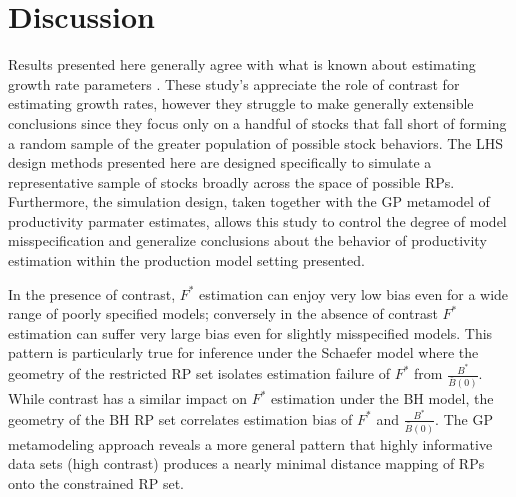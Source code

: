 %
\section{Discussion}


%
Results presented here generally agree with what is known about estimating
growth rate parameters .
These study's appreciate the role of contrast for estimating growth rates, 
however they struggle to make generally extensible conclusions since they focus only 
on a handful of stocks that fall short of forming a random sample of the greater 
population of possible stock behaviors. The LHS design methods presented here are 
designed specifically to simulate a representative sample of stocks broadly 
across the space of possible RPs. Furthermore, the simulation design, taken together 
with the GP metamodel of productivity parmater estimates, allows this study to control 
the degree of model misspecification and generalize conclusions about the behavior 
of productivity estimation within the production model setting presented. 


%
In the presence of contrast, $F^*$ estimation can enjoy very low bias even
for a wide range of poorly specified models; conversely in the absence of contrast
$F^*$ estimation can suffer very large bias even for slightly misspecified models.
This pattern is particularly true for inference under the Schaefer model where the 
geometry of the restricted RP set isolates estimation failure of $F^*$ from 
$\frac{B^*}{\bar B(0)}$. While contrast has a similar impact on $F^*$ estimation 
under the BH model, the geometry of the BH RP set correlates estimation bias 
of $F^*$ and $\frac{B^*}{\bar B(0)}$. The GP metamodeling approach reveals a 
more general pattern that highly informative data sets (high contrast) 
produces a nearly minimal distance mapping of RPs %
onto the constrained RP set.

